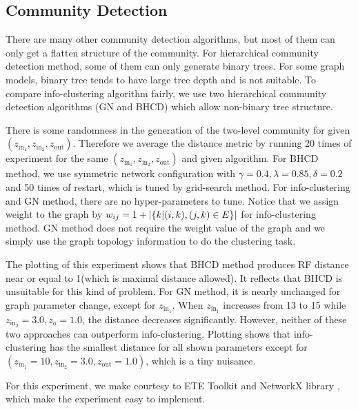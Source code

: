 \documentclass{article}
\begin{document}
\subsection{Community Detection}
There are many other community detection algorithms, but most of them can only get a flatten structure of the community. For hierarchical community detection method, some of them can only generate binary trees. For some graph models, binary tree tends to have large tree depth and is not suitable. To compare info-clustering algorithm fairly, we use two hierarchical community detection algorithms (GN and BHCD) which allow non-binary tree structure.
 
There is some randomness in the generation of the two-level community for given $(z_{\mathrm{in}_1}, z_{\mathrm{in}_2}, z_{\mathrm{out}})$. Therefore we average the distance metric by running 20 times of experiment for the same $(z_{\mathrm{in}_1}, z_{\mathrm{in}_2}, z_{\mathrm{out}})$ and given algorithm. For BHCD method, we use symmetric network configuration with $\gamma = 0.4, \lambda=0.85, \delta=0.2$ and 50 times of restart, which is tuned by grid-search method. For info-clustering and GN method, there are no hyper-parameters to tune. Notice that we assign weight to the graph by 
$w_{ij} = 1 + \lvert\{k | (i,k),(j,k) \in E \}\rvert$
for info-clustering method. GN method does not require the weight value of the graph and we simply use the graph topology information to do the clustering task.

The plotting of this experiment shows that BHCD method produces RF distance near or equal to 1(which is maximal distance allowed). It reflects that BHCD is unsuitable for this kind of problem. For GN method, it is nearly unchanged for graph parameter change, except for $z_{\mathrm{in}_1}$. When $z_{\mathrm{in}_1}$ increases from 13 to 15 while $z_{\mathrm{in}_2}=3.0, z_o=1.0$, the distance decreases significantly. However, neither of these two approaches can outperform info-clustering. Plotting shows that info-clustering has the smallest distance for all shown parameters except for $(z_{\mathrm{in}_1}=10, z_{\mathrm{in}_2}=3.0, z_{\mathrm{out}}=1.0)$, which is a tiny nuisance. 

For this experiment, we make courtesy to ETE Toolkit\cite{ete3} and NetworkX library \cite{SciPyProceedings_11}, which make the experiment easy to implement.



\end{document}
